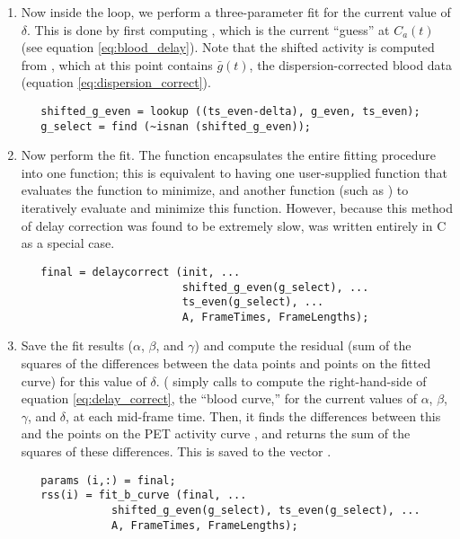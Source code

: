 \begin{enumerate}
\item Now inside the loop, we perform a three-parameter fit for the
  current value of $\delta$.  This is done by first computing
  , which is the current ``guess'' at $C_a (t)$
  (see equation \ref{eq:blood_delay}).  Note that the shifted
  activity is computed from , which at this point
  contains $\bar g (t)$, the dispersion-corrected blood data (equation
  \ref{eq:dispersion_correct}).
\begin{verbatim}
   shifted_g_even = lookup ((ts_even-delta), g_even, ts_even);
   g_select = find (~isnan (shifted_g_even));
\end{verbatim}

\item Now perform the fit.  The function 
  encapsulates the entire fitting procedure into one function; this is
  equivalent to having one user-supplied function that evaluates the
  function to minimize, and another function (such as ) to
  iteratively evaluate and minimize this function.  However, because
  this method of delay correction was found to be extremely slow,
   was written entirely in C as a special case.

\begin{verbatim}
   final = delaycorrect (init, ...
                         shifted_g_even(g_select), ...
                         ts_even(g_select), ...
                         A, FrameTimes, FrameLengths);
\end{verbatim}

\item Save the fit results ($\alpha$, $\beta$, and $\gamma$) and
  compute the residual (sum of the squares of the differences between
  the data points and points on the fitted curve) for this value of
  $\delta$.  ( simply calls  to
  compute the right-hand-side of equation \ref{eq:delay_correct}, the
  ``blood curve,'' for the current values of $\alpha$, $\beta$,
  $\gamma$, and $\delta$, at each mid-frame time.  Then, it finds the
  differences between this and the points on the PET activity curve
  , and returns the sum of the squares of these differences.
  This is saved to the vector .
\begin{verbatim}
   params (i,:) = final;
   rss(i) = fit_b_curve (final, ...
              shifted_g_even(g_select), ts_even(g_select), ...
              A, FrameTimes, FrameLengths);
\end{verbatim}


\end{enumerate}
